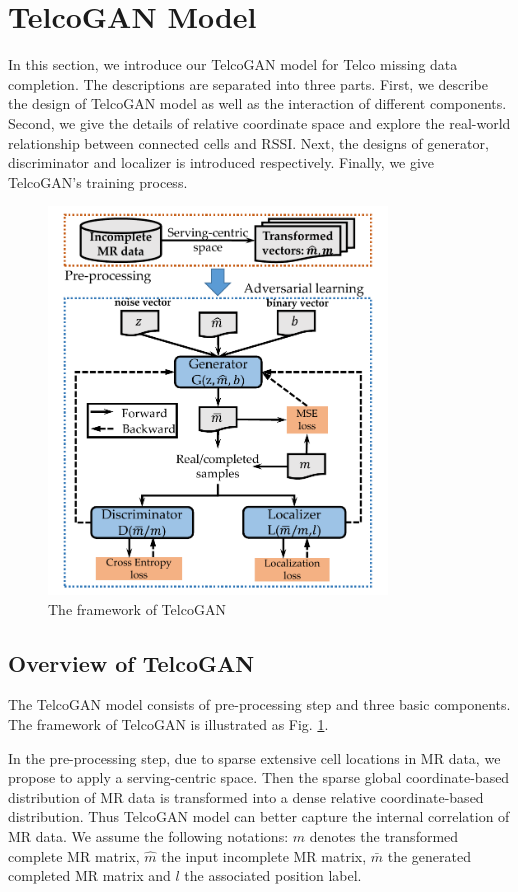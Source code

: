 \section{TelcoGAN Model}
In this section, we introduce our TelcoGAN model for Telco missing data completion. The descriptions are separated into three parts. First, we describe the design of TelcoGAN model as well as the interaction of different components. Second, we give the details of relative coordinate space and explore the real-world relationship between connected cells and RSSI. Next, the designs of generator, discriminator and localizer is introduced respectively. Finally, we give TelcoGAN's training process.

\begin{figure}
  \centering
  \includegraphics[width=9cm]{pics/framework.pdf}
  \caption{The framework of TelcoGAN}\label{fig:framework}
\end{figure}


\subsection{Overview of TelcoGAN}
The TelcoGAN model consists of pre-processing step and three basic components. The framework of TelcoGAN is illustrated as Fig. \ref{fig:framework}.

In the pre-processing step, due to sparse extensive cell locations in MR data, we propose to apply a serving-centric space. Then the sparse global coordinate-based distribution of MR data is transformed into a dense relative coordinate-based distribution. Thus TelcoGAN model can better capture the internal correlation of MR data. We assume the following notations: $m$ denotes the transformed complete MR matrix, $\hat{m}$ the input incomplete MR matrix, $\bar{m}$ the generated completed MR matrix and $l$ the associated position label.

